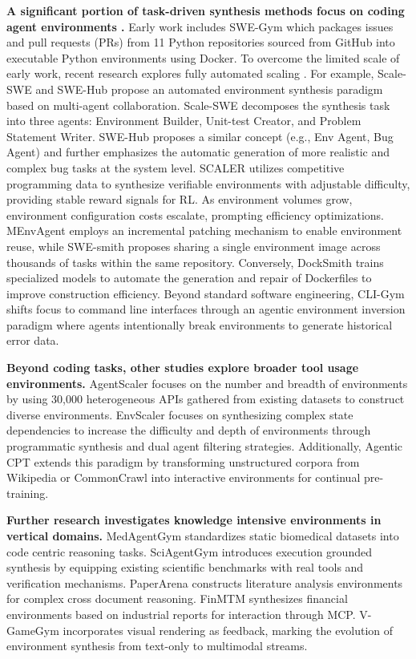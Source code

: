 \documentclass{llmxive}
\begin{document}
\textbf{A significant portion of task-driven synthesis methods focus on coding agent environments \cite{CodeGym, Agent2World}.} Early work includes SWE-Gym \cite{SWE-Gym} which packages issues and pull requests (PRs) from 11 Python repositories sourced from GitHub into executable Python environments using Docker. To overcome the limited scale of early work, recent research explores fully automated scaling \cite{R2E-Gym,Nemotron-Terminal}. For example, Scale-SWE \cite{Scale-SWE} and SWE-Hub \cite{SWE-Hub} propose an automated environment synthesis paradigm based on multi-agent collaboration. Scale-SWE \cite{Scale-SWE} decomposes the synthesis task into three agents: Environment Builder, Unit-test Creator, and Problem Statement Writer. SWE-Hub \cite{SWE-Hub} proposes a similar concept (e.g., Env Agent, Bug Agent) and further emphasizes the automatic generation of more realistic and complex bug tasks at the system level. SCALER \cite{SCALER} utilizes competitive programming data to synthesize verifiable environments with adjustable difficulty, providing stable reward signals for RL. As environment volumes grow, environment configuration costs escalate, prompting efficiency optimizations. MEnvAgent \cite{MEnvAgent} employs an incremental patching mechanism to enable environment reuse, while SWE-smith \cite{SWE-smith} proposes sharing a single environment image across thousands of tasks within the same repository. Conversely, DockSmith \cite{DockSmith} trains specialized models to automate the generation and repair of Dockerfiles to improve construction efficiency. Beyond standard software engineering, CLI-Gym \cite{CLI-Gym} shifts focus to command line interfaces through an agentic environment inversion paradigm where agents intentionally break environments to generate historical error data. 

\textbf{Beyond coding tasks, other studies explore broader tool usage environments.} AgentScaler \cite{AgentScaler} focuses on the number and breadth of environments by using 30,000 heterogeneous APIs gathered from existing datasets to construct diverse environments. EnvScaler \cite{EnvScaler} focuses on synthesizing complex state dependencies to increase the difficulty and depth of environments through programmatic synthesis and dual agent filtering strategies. Additionally, Agentic CPT \cite{Agent_CPT} extends this paradigm by transforming unstructured corpora from Wikipedia or CommonCrawl into interactive environments for continual pre-training.

\textbf{Further research investigates knowledge intensive environments in vertical domains.} MedAgentGym \cite{MedAgentGym} standardizes static biomedical datasets into code centric reasoning tasks. SciAgentGym \cite{SciAgentGym} introduces execution grounded synthesis by equipping existing scientific benchmarks with real tools and verification mechanisms. PaperArena \cite{PaperArena} constructs literature analysis environments for complex cross document reasoning. FinMTM \cite{FinMTM} synthesizes financial environments based on industrial reports for interaction through MCP. V-GameGym \cite{V-GameGym} incorporates visual rendering as feedback, marking the evolution of environment synthesis from text-only to multimodal streams. 
\end{document}
